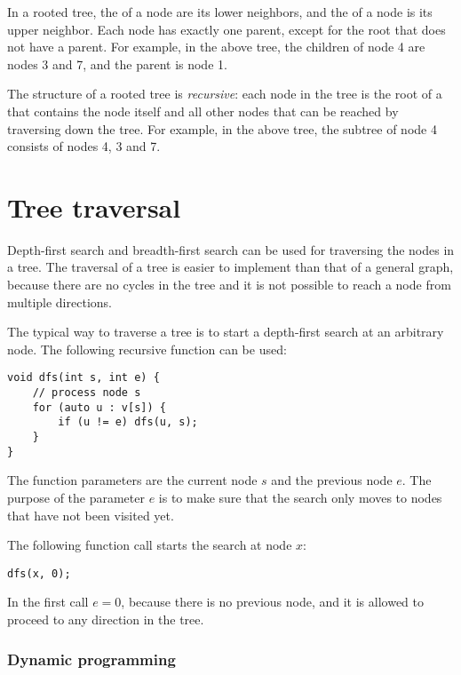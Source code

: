 
In a rooted tree, the  of a node
are its lower neighbors, and the  of a node
is its upper neighbor.
Each node has exactly one parent,
except for the root that does not have a parent.
For example, in the above tree,
the children of node 4 are nodes 3 and 7,
and the parent is node 1.


The structure of a rooted tree is \emph{recursive}:
each node in the tree is the root of a 
that contains the node itself and all other nodes
that can be reached by traversing down the tree.
For example, in the above tree, the subtree of node 4
consists of nodes 4, 3 and 7.

\section{Tree traversal}

Depth-first search and breadth-first search
can be used for traversing the nodes in a tree.
The traversal of a tree is easier to implement than
that of a general graph, because
there are no cycles in the tree and it is not
possible to reach a node from multiple directions.

The typical way to traverse a tree is to start
a depth-first search at an arbitrary node.
The following recursive function can be used:

\begin{lstlisting}
void dfs(int s, int e) {
    // process node s
    for (auto u : v[s]) {
        if (u != e) dfs(u, s);
    }
}
\end{lstlisting}

The function parameters are the current node $s$
and the previous node $e$.
The purpose of the parameter $e$ is to make sure
that the search only moves to nodes
that have not been visited yet.

The following function call starts the search
at node $x$:

\begin{lstlisting}
dfs(x, 0);
\end{lstlisting}

In the first call $e=0$, because there is no
previous node, and it is allowed
to proceed to any direction in the tree.

\subsubsection{Dynamic programming}

